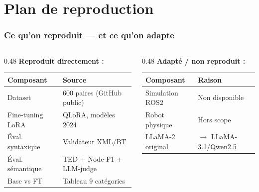 \documentclass[aspectratio=169]{beamer}
\begin{document}
\section{Plan de reproduction}

\begin{frame}
  \frametitle{Ce qu'on reproduit — et ce qu'on adapte}

  \begin{columns}[T]
    \begin{column}{0.48\textwidth}
      \textbf{Reproduit directement :}

      \vspace{0.2em}
      {\scriptsize\begin{tabular}{p{2.8cm}p{3cm}}
        \toprule
        Composant & Source \\
        \midrule
        Dataset & 600 paires (GitHub public) \\
        Fine-tuning LoRA & QLoRA, modèles 2024 \\
        Éval. syntaxique & Validateur XML/BT \\
        Éval. sémantique & TED + Node-F1 + LLM-judge \\
        Base vs FT & Tableau 9 catégories \\
        \bottomrule
      \end{tabular}}
    \end{column}
    \begin{column}{0.48\textwidth}
      \textbf{Adapté / non reproduit :}

      \vspace{0.2em}
      {\scriptsize\begin{tabular}{p{2.4cm}p{2.4cm}}
        \toprule
        Composant & Raison \\
        \midrule
        Simulation ROS2 & Non disponible \\
        Robot physique & Hors scope \\
        LLaMA-2 original & $\to$ LLaMA-3.1/Qwen2.5 \\
        \bottomrule
      \end{tabular}}


\end{column}
\end{columns}
\end{frame}
\end{document}
